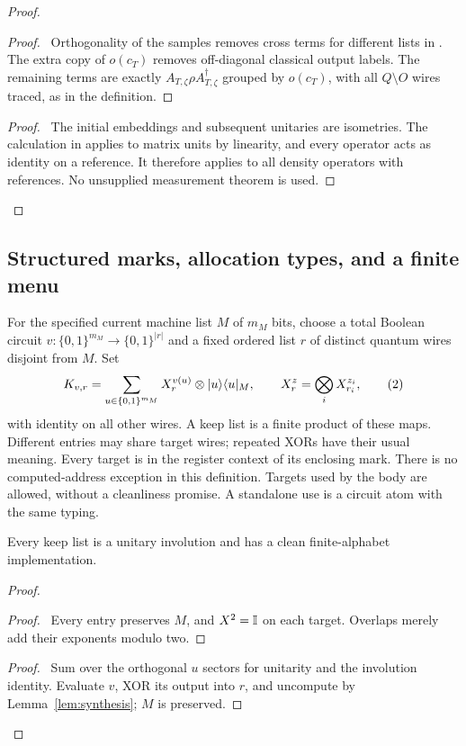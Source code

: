 \begin{proof}
 \begin{proof}\pf\ Orthogonality of the samples removes cross terms
 for different lists in . The extra copy of
 $o(c_T)$ removes off-diagonal classical output labels. The remaining
 terms are exactly $A_{T,\zeta}\rho A_{T,\zeta}^\dagger$ grouped by
 $o(c_T)$, with all $Q\setminus O$ wires traced, as in the definition.\end{proof}
 \qedstep
 \begin{proof}\pf\ The initial embeddings and subsequent unitaries are
 isometries. The calculation in  applies to
 matrix units by linearity, and every operator acts as identity on a
 reference. It therefore applies to all density operators with references.
 No unsupplied measurement theorem is used.\end{proof}
\end{proof}

\subsection{Structured marks, allocation types, and a finite menu}

\begin{definition}[Keep]\label{def:keep}
For the specified current machine list $M$ of $m_M$ bits, choose a total
Boolean circuit $v:\{0,1\}^{m_M}\to\{0,1\}^{|r|}$ and a fixed ordered
list $r$ of distinct quantum wires disjoint from $M$. Set
\[
 K_{v,r}=\sum_{u\in\{0,1\}^{m_M}}X_r^{v(u)}\otimes\lvert u\rangle\langle u\rvert_M,
 \qquad X_r^z=\bigotimes_i X_{r_i}^{z_i},                 \tag{2}
\]
with identity on all other wires. A keep list is a finite product of
these maps. Different entries may share target wires; repeated XORs
have their usual meaning. Every target is in the register context of
its enclosing mark. There is no computed-address exception in this
definition. Targets used by the body are allowed, without a cleanliness
promise. A standalone use is a circuit atom with the same typing.
\end{definition}

\begin{lemma}\label{lem:keep}
Every keep list is a unitary involution and has a clean finite-alphabet
implementation.
\end{lemma}
\begin{proof}
 \begin{proof}\pf\ Every entry preserves $M$, and $X^2=\mathbb{I}$ on each
 target. Overlaps merely add their exponents modulo two.\end{proof}
 \qedstep
 \begin{proof}\pf\ Sum over the orthogonal $u$ sectors for unitarity
 and the involution identity. Evaluate $v$, XOR its output into $r$,
 and uncompute by Lemma~\ref{lem:synthesis}; $M$ is preserved.\end{proof}
\end{proof}


